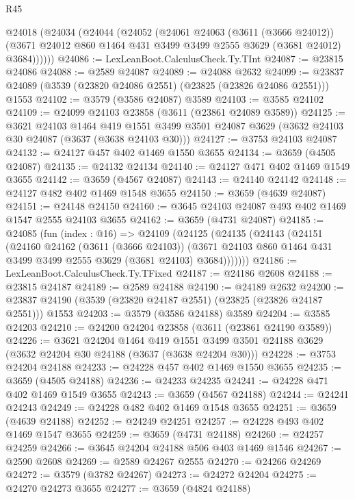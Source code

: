 \begin{lexlean}{R45}
\begin{coremodule}
    @24018
      (@24034
        (@24044
          (@24052
            (@24061
              @24063
              (@3611 (@3666 @24012))
              (@3671 @24012 @860 @1464 @431 @3499 @3499 @2555 @3629 (@3681 @24012) @3684))))))
@24086 := LexLeanBoot.CalculusCheck.Ty.TInt
@24087 := @23815 @24086
@24088 := @2589 @24087
@24089 := @24088 @2632
@24099 := @23837 @24089 (@3539 (@23820 @24086 @2551) (@23825 (@23826 @24086 @2551))) @1553
@24102 := @3579 (@3586 @24087) @3589
@24103 := @3585 @24102
@24109 := @24099 @24103 @23858 (@3611 (@23861 @24089 @3589))
@24125 := @3621
    @24103
    @1464
    @419
    @1551
    @3499
    @3501
    @24087
    @3629
    (@3632 @24103 @30 @24087 (@3637 (@3638 @24103 @30)))
@24127 := @3753 @24103 @24087
@24132 := @24127 @457 @402 @1469 @1550 @3655
@24134 := @3659 (@4505 @24087)
@24135 := @24132 @24134
@24140 := @24127 @471 @402 @1469 @1549 @3655
@24142 := @3659 (@4567 @24087)
@24143 := @24140 @24142
@24148 := @24127 @482 @402 @1469 @1548 @3655
@24150 := @3659 (@4639 @24087)
@24151 := @24148 @24150
@24160 := @3645 @24103 @24087 @493 @402 @1469 @1547 @2555 @24103 @3655
@24162 := @3659 (@4731 @24087)
@24185 := @24085
    (fun (index : @16) =>
    @24109
      (@24125
        (@24135
          (@24143
            (@24151
              (@24160
                @24162
                (@3611 (@3666 @24103))
                (@3671 @24103 @860 @1464 @431 @3499 @3499 @2555 @3629 (@3681 @24103) @3684)))))))
@24186 := LexLeanBoot.CalculusCheck.Ty.TFixed
@24187 := @24186 @2608
@24188 := @23815 @24187
@24189 := @2589 @24188
@24190 := @24189 @2632
@24200 := @23837 @24190 (@3539 (@23820 @24187 @2551) (@23825 (@23826 @24187 @2551))) @1553
@24203 := @3579 (@3586 @24188) @3589
@24204 := @3585 @24203
@24210 := @24200 @24204 @23858 (@3611 (@23861 @24190 @3589))
@24226 := @3621
    @24204
    @1464
    @419
    @1551
    @3499
    @3501
    @24188
    @3629
    (@3632 @24204 @30 @24188 (@3637 (@3638 @24204 @30)))
@24228 := @3753 @24204 @24188
@24233 := @24228 @457 @402 @1469 @1550 @3655
@24235 := @3659 (@4505 @24188)
@24236 := @24233 @24235
@24241 := @24228 @471 @402 @1469 @1549 @3655
@24243 := @3659 (@4567 @24188)
@24244 := @24241 @24243
@24249 := @24228 @482 @402 @1469 @1548 @3655
@24251 := @3659 (@4639 @24188)
@24252 := @24249 @24251
@24257 := @24228 @493 @402 @1469 @1547 @3655
@24259 := @3659 (@4731 @24188)
@24260 := @24257 @24259
@24266 := @3645 @24204 @24188 @506 @403 @1469 @1546
@24267 := @2590 @2608
@24269 := @2589 @24267 @2555
@24270 := @24266 @24269
@24272 := @3579 (@3782 @24267)
@24273 := @24272 @24204
@24275 := @24270 @24273 @3655
@24277 := @3659 (@4824 @24188)

\end{coremodule}
\end{lexlean}
